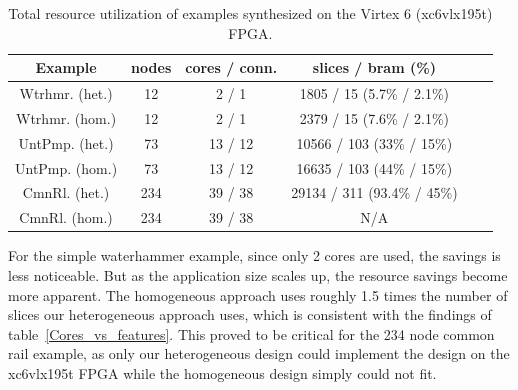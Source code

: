 \begin{table}
\caption{Total resource utilization of examples synthesized on the Virtex 6 (xc6vlx195t) FPGA.}
\begin{center}
\begin{tabular}{|c|c|c|c|c|c|}
\hline
Example & nodes & cores / conn. & slices / bram (\%) \\ \hline
Wtrhmr. (het.) & 12 & 2 / 1 & 1805 / 15 (5.7\% / 2.1\%) \\ \hline
Wtrhmr. (hom.) & 12 & 2 / 1 & 2379 / 15 (7.6\% / 2.1\%)\\ \hline
UntPmp. (het.) & 73 & 13 / 12 & 10566 / 103 (33\% / 15\%)\\ \hline
UntPmp. (hom.) & 73 & 13 / 12 & 16635 / 103 (44\% / 15\%)\\ \hline
CmnRl. (het.) & 234 & 39 / 38 & 29134 / 311 (93.4\% / 45\%) \\ \hline
CmnRl. (hom.) & 234 & 39 / 38 & N/A \\ \hline
\end{tabular}
\end{center}
\label{table:example_results}
\end{table}
For the simple waterhammer example, since only 2 cores are used, the savings is less noticeable. 
But as the application size scales up, the resource savings become more apparent.
The homogeneous approach uses roughly 1.5 times the number of slices our heterogeneous approach uses, which is consistent with the findings of table~\ref{Cores_vs_features}.
This proved to be critical for the 234 node common rail example, as only our heterogeneous design could implement the design on the xc6vlx195t FPGA while the homogeneous design simply could not fit.

